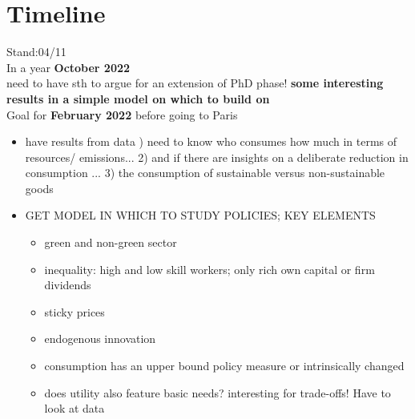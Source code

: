 \section{Timeline}



Stand:04/11 \\
In a year \ar \textbf{October 2022}\\ need to have sth to argue for an extension of PhD phase! 
\ar \textbf{some interesting results in a simple model on which to build on }
\\

Goal for \textbf{February 2022 }before going to Paris
\begin{itemize}
\item have results from data ) need to know who consumes how much in terms of resources/ emissions... 2) and if there are insights on a deliberate reduction in consumption ... 3) the consumption of sustainable versus non-sustainable goods
\item GET MODEL IN WHICH TO STUDY POLICIES; KEY ELEMENTS
\begin{itemize}
\item green and non-green sector
\item inequality: high and low skill workers; only rich own capital or firm dividends
\item sticky prices
\item endogenous innovation 
\item consumption has an upper bound \ar policy measure or intrinsically changed\\
\item does utility also feature basic needs? \ar interesting for trade-offs! Have to look at data
\end{itemize}

\end{itemize}